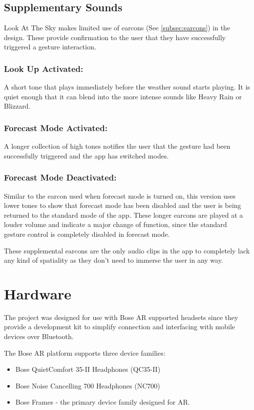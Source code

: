 \documentclass{l4proj}
\begin{document}
\subsection{Supplementary Sounds}

Look At The Sky makes limited use of earcons (See \ref{subsec:earcons}) in the design. These provide confirmation to the user that they have successfully triggered a gesture interaction.

\subsubsection{Look Up Activated:}
A short tone that plays immediately before the weather sound starts playing. It is quiet enough that it can blend into the more intense sounds like Heavy Rain or Blizzard.

\subsubsection{Forecast Mode Activated:}
A longer collection of high tones notifies the user that the gesture had been successfully triggered and the app has switched modes.  

\subsubsection{Forecast Mode Deactivated: }
Similar to the earcon used when forecast mode is turned on, this version uses lower tones to show that forecast mode has been disabled and the user is being returned to the standard mode of the app. 
These longer earcons are played at a louder volume and indicate a major change of function, since the standard gesture control is completely disabled in forecast mode.

These supplemental earcons are the only audio clips in the app to completely lack any kind of spatiality as they don't need to immerse the user in any way.

\section{Hardware}
The project was designed for use with Bose AR supported headsets since they provide a development kit to simplify connection and interfacing with mobile devices over Bluetooth.

The Bose AR platform supports three device families:
\begin{itemize}
    \item Bose QuietComfort 35-II Headphones (QC35-II)
    \item Bose Noise Cancelling 700 Headphones (NC700)
    \item Bose Frames - the primary device family designed for AR.
\end{itemize}
\end{document}
